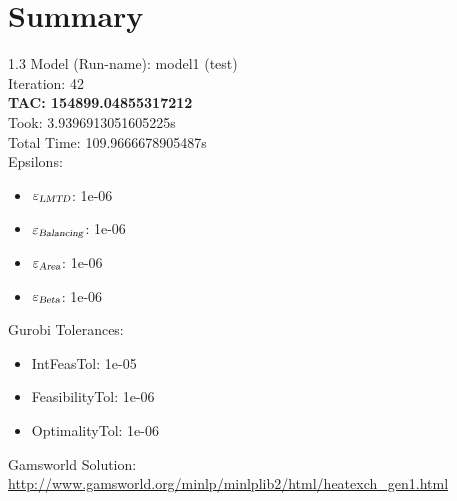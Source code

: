 \documentclass{article}%
\begin{document}
%
\normalsize%
\section{Summary}%
\thispagestyle{plain}%
\begin{spacing}{1.3}%
\Large%
Model (Run-name): model1 (test)\\%
Iteration: 42\\%
\textbf{TAC: 154899.04855317212}\\%
Took: 3.9396913051605225s\\%
Total Time: 109.9666678905487s\\%
Epsilons:%
\begin{itemize}%
	\item $\varepsilon_{\textsl{LMTD}}$: 1e-06%
	\item $\varepsilon_{\textsl{Balancing}}$: 1e-06%
	\item $\varepsilon_{\textsl{Area}}$: 1e-06%
	\item $\varepsilon_{\textsl{Beta}}$: 1e-06%
\end{itemize}%
Gurobi Tolerances:%
\begin{itemize}%
	\item IntFeasTol: 1e-05%
	\item FeasibilityTol: 1e-06%
	\item OptimalityTol: 1e-06%
\end{itemize}%
\end{spacing}%
\normalsize%
Gamsworld Solution: \url{http://www.gamsworld.org/minlp/minlplib2/html/heatexch_gen1.html}%
%
\clearpage%
\end{document}
